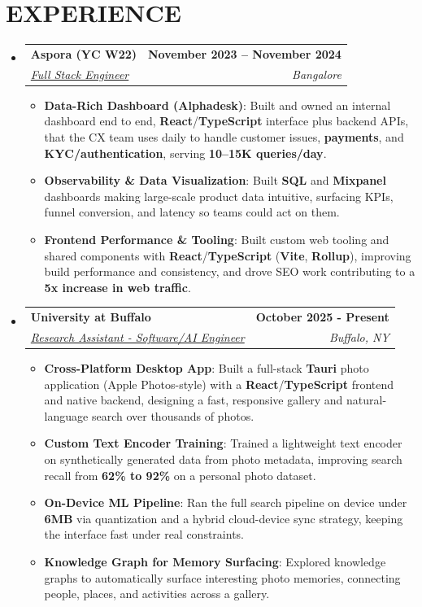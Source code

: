 \documentclass[letterpaper,11pt]{article}
\makeatletter
\newcommand{\resumeItem}[1]{\item\small{{#1 \vspace{-3pt}}}}
\newcommand{\resumeSubheading}[4]{\vspace{-2pt}\item\begin{tabular*}{1.0\textwidth}[t]{l@{\extracolsep{\fill}}r}\textbf{\large#1} & \textbf{\small #2} \\ \textit{\large#3} & \textit{\small #4} \\ \end{tabular*}\vspace{-7pt}}
\newcommand{\resumeSubHeadingListStart}{\begin{itemize}[leftmargin=0.0in, label={}]}
\newcommand{\resumeSubHeadingListEnd}{\end{itemize}}
\newcommand{\resumeItemListStart}{\begin{itemize}}
\newcommand{\resumeItemListEnd}{\end{itemize}\vspace{-6pt}}
\makeatother
\begin{document}
\section{EXPERIENCE}
  \resumeSubHeadingListStart
    \resumeSubheading
      {Aspora (YC W22)}{November 2023 -- November 2024} 
      {\underline{Full Stack Engineer}}{Bangalore}
      \resumeItemListStart
        \resumeItem{\textbf{Data-Rich Dashboard (Alphadesk)}: Built and owned an internal dashboard end to end, \textbf{React}/\textbf{TypeScript} interface plus backend APIs, that the CX team uses daily to handle customer issues, \textbf{payments}, and \textbf{KYC/authentication}, serving \textbf{10--15K queries/day}.}
        \resumeItem{\textbf{Observability \& Data Visualization}: Built \textbf{SQL} and \textbf{Mixpanel} dashboards making large-scale product data intuitive, surfacing KPIs, funnel conversion, and latency so teams could act on them.}
        \resumeItem{\textbf{Frontend Performance \& Tooling}: Built custom web tooling and shared components with \textbf{React}/\textbf{TypeScript} (\textbf{Vite}, \textbf{Rollup}), improving build performance and consistency, and drove SEO work contributing to a \textbf{5x increase in web traffic}.}
      \resumeItemListEnd
    \resumeSubheading
      {University at Buffalo}{October 2025 - Present}
      {\underline{Research Assistant - Software/AI Engineer}}{Buffalo, NY}
      \resumeItemListStart
        \resumeItem{\textbf{Cross-Platform Desktop App}: Built a full-stack \textbf{Tauri} photo application (Apple Photos-style) with a \textbf{React}/\textbf{TypeScript} frontend and native backend, designing a fast, responsive gallery and natural-language search over thousands of photos.}
        \resumeItem{\textbf{Custom Text Encoder Training}: Trained a lightweight text encoder on synthetically generated data from photo metadata, improving search recall from \textbf{62\% to 92\%} on a personal photo dataset.}
        \resumeItem{\textbf{On-Device ML Pipeline}: Ran the full search pipeline on device under \textbf{6MB} via quantization and a hybrid cloud-device sync strategy, keeping the interface fast under real constraints.}
        \resumeItem{\textbf{Knowledge Graph for Memory Surfacing}: Explored knowledge graphs to automatically surface interesting photo memories, connecting people, places, and activities across a gallery.}
      \resumeItemListEnd
  \resumeSubHeadingListEnd
\end{document}
